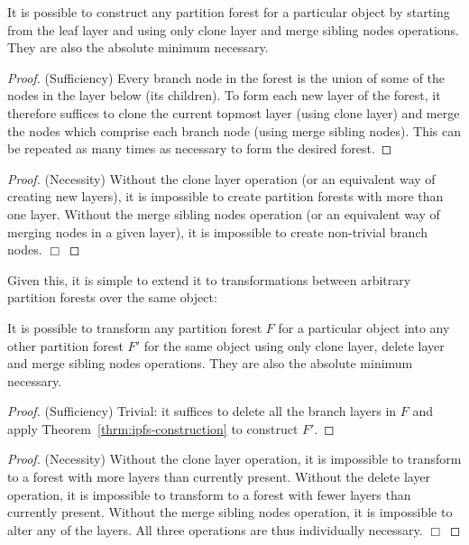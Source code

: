 \begin{theorem}
\label{thrm:ipfs-construction}
It is possible to construct any partition forest for a particular object by starting from the leaf layer and using only clone layer and merge sibling nodes operations. They are also the absolute minimum necessary.
\end{theorem}

\begin{proof}
(Sufficiency) Every branch node in the forest is the union of some of the nodes in the layer below (its children). To form each new layer of the forest, it therefore suffices to clone the current topmost layer (using clone layer) and merge the nodes which comprise each branch node (using merge sibling nodes). This can be repeated as many times as necessary to form the desired forest.
\end{proof}

\begin{proof}
(Necessity) Without the clone layer operation (or an equivalent way of creating new layers), it is impossible to create partition forests with more than one layer. Without the merge sibling nodes operation (or an equivalent way of merging nodes in a given layer), it is impossible to create non-trivial branch nodes. $\Box$
\end{proof}

\noindent Given this, it is simple to extend it to transformations between arbitrary partition forests over the same object:

\begin{theorem}
\label{thrm:ipfs-transformation}
It is possible to transform any partition forest $F$ for a particular object into any other partition forest $F'$ for the same object using only clone layer, delete layer and merge sibling nodes operations. They are also the absolute minimum necessary.
\end{theorem}

\begin{proof}
(Sufficiency) Trivial: it suffices to delete all the branch layers in $F$ and apply Theorem~\ref{thrm:ipfs-construction} to construct $F'$.
\end{proof}

\begin{proof}
(Necessity) Without the clone layer operation, it is impossible to transform to a forest with more layers than currently present. Without the delete layer operation, it is impossible to transform to a forest with fewer layers than currently present. Without the merge sibling nodes operation, it is impossible to alter any of the layers. All three operations are thus individually necessary. $\Box$
\end{proof}

